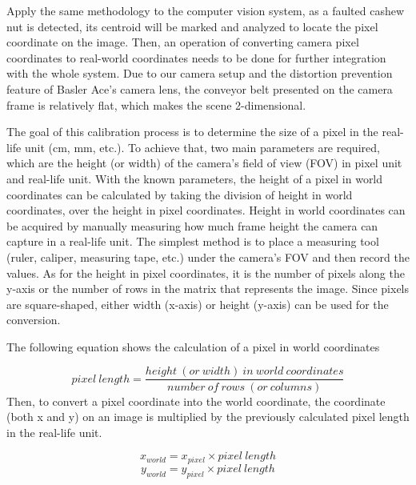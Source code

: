\documentclass[10pt, letterpaper]{article}
\begin{document}
    Apply the same methodology to the computer vision system, as a faulted cashew nut is detected, its centroid will be marked and analyzed to locate the pixel coordinate on the image. Then, an operation of converting camera pixel coordinates to real-world coordinates needs to be done for further integration with the whole system. Due to our camera setup and the distortion prevention feature of Basler Ace’s camera lens, the conveyor belt presented on the camera frame is relatively flat, which makes the scene 2-dimensional.\par
    The goal of this calibration process is to determine the size of a pixel in the real-life unit (cm, mm, etc.). To achieve that, two main parameters are required, which are the height (or width) of the camera’s field of view (FOV) in pixel unit and real-life unit. With the known parameters, the height of a pixel in world coordinates can be calculated by taking the division of height in world coordinates, over the height in pixel coordinates. Height in world coordinates can be acquired by manually measuring how much frame height the camera can capture in a real-life unit. The simplest method is to place a measuring tool (ruler, caliper, measuring tape, etc.) under the camera’s FOV and then record the values. As for the height in pixel coordinates, it is the number of pixels along the y-axis or the number of rows in the matrix that represents the image. Since pixels are square-shaped, either width (x-axis) or height (y-axis) can be used for the conversion.\par
    The following equation shows the calculation of a pixel in world coordinates \par
    \begin{equation} \label{eq6} pixel\:length = \frac{height\:(or\:width)\:in\:world\:coordinates}{number\:of\:rows\:(or\:columns)} \end{equation}
    Then, to convert a pixel coordinate into the world coordinate, the coordinate (both x and y) on an image is multiplied by the previously calculated pixel length in the real-life unit.\par
    \begin{equation} \label{eq7} x_{world} = x_{pixel} \times pixel\:length \end{equation}
    \begin{equation} \label{eq8} y_{world} = y_{pixel} \times pixel\:length \end{equation}
    
\end{document}
